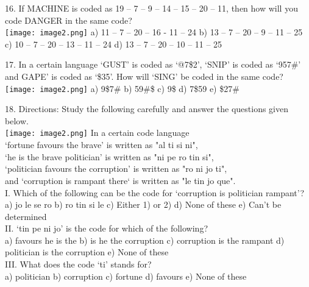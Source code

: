 \documentclass[
]{article}
\begin{document}
16. If MACHINE is coded as 19 – 7 – 9 – 14 – 15 – 20 – 11, then how will you code DANGER in the same code?\\
\texttt{[image: image2.png]}
a) 11 – 7 – 20 – 16 - 11 – 24 \hspace{1mm} b) 13 – 7 – 20 – 9 – 11 – 25
c) 10 – 7 – 20 – 13 – 11 – 24 \hspace{1mm} d) 13 – 7 – 20 – 10 – 11 – 25

17. In a certain language ‘GUST’ is coded as ‘@7\$2’, ‘SNIP’ is coded as ‘957\#’ and GAPE’ is coded as ‘\β\$35’. How will ‘SING’ be coded in the same code?\\
\texttt{[image: image2.png]}
a) 9\$7\# b) 59\#\$ c) 9\$ d) 7\$59 e) \$27\#

18. Directions: Study the following carefully and answer the questions given below.\\
\texttt{[image: image2.png]}
In a certain code language\\
‘fortune favours the brave’ is written as "al ti si ni",\\
‘he is the brave politician’ is written as "ni pe ro tin si",\\
‘politician favours the corruption’ is written as "ro ni jo ti",\\
and ‘corruption is rampant there‘ is written as "le tin jo que".\\
I. Which of the following can be the code for ‘corruption is politician rampant’?\\
a) jo le se ro \hspace{1mm} b) ro tin si le \hspace{1mm} c) Either 1) or 2)
\hspace{1mm} d) None of these \hspace{1mm} e) Can’t be determined\\

II. ‘tin pe ni jo’ is the code for which of the following?\\
a) favours he is the \hspace{1mm} b) is he the corruption \hspace{1mm} c) corruption is the rampant \hspace{1mm} d) politician is the corruption \hspace{1mm} e) None of these\\

III. What does the code ‘ti’ stands for?\\
a) politician \hspace{1mm} b) corruption \hspace{1mm} c) fortune \hspace{1mm} d) favours \hspace{1mm} e) None of these\\
\end{document}
